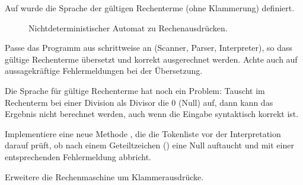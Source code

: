 \documentclass[10pt, a4paper, ngerman]{scrartcl}
\begin{document}
\begin{aufgabe}[subtitle=Rechenterme]
	\label{aufg:rechenterme}
	Auf  wurde die Sprache der gültigen Rechenterme (ohne Klammerung) definiert.

	\begin{figure}[h]
		\centering
		\begin{transitiongraph}[fa]

		\end{transitiongraph}
		\caption{Nichtdeterministischer Automat zu Rechenausdrücken.}
		\label{abb:graph-rechenausdruck}
	\end{figure}

	Passe das Programm aus  schrittweise an (Scanner, Parser, Interpreter),
	so dass gültige Rechenterme übersetzt und korrekt ausgerechnet werden. Achte auch auf
	aussagekräftige Fehlermeldungen bei der Übersetzung.

\end{aufgabe}


\begin{aufgabe}[subtitle=Semantische Analyse,icon=\iconStern]
	\label{aufg:semantik}
	Die Sprache für gültige Rechenterme hat noch ein Problem: Tauscht im Rechenterm bei einer
	Division als Divisor die 0 (Null) auf, dann kann das Ergebnis nicht berechnet werden, auch wenn
	die Eingabe syntaktisch korrekt ist.

	Implementiere eine neue Methode , die die Tokenliste vor der
	Interpretation darauf prüft, ob nach einem Geteiltzeichen (\code{:}) eine Null auftaucht und
	mit einer entsprechenden Fehlermeldung abbricht.
\end{aufgabe}

\begin{aufgabe}[subtitle=Klammerausdrücke,icon=\iconStern]
	\label{aufg:nka}
	Erweitere die Rechenmaschine um Klammerausdrücke.
\end{aufgabe}
\end{document}
